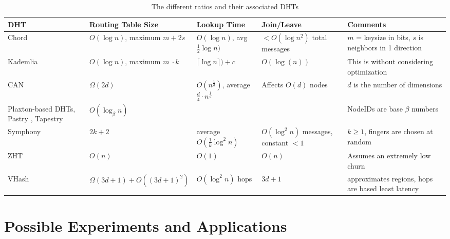 \documentclass[10pt,letterpaper,twoside]{report}
\begin{document}
\begin{table}[h]
	\small
	\centering
	\begin{tabularx}{\textwidth}{ |X|X|X|X|X| }
		\hline
		DHT & Routing Table Size & Lookup Time & Join/Leave & Comments \\ \hline  
		
		Chord \cite{chord} & $O(\log n)$, maximum $m +2s$ & $O(\log n)$, avg $\frac{1}{2} \log n)$  &  $<O(\log n^{2})$ total messages& $m$  = keysize in bits, $s$ is neighbors in 1 direction  \\ \hline
		
		Kademlia \cite{kademlia} & $O(\log n)$, maximum $m\ \cdot k$ & $\lceil \log n\rceil) + c$ & $O(\log(n))$& This is without considering optimization   \\ \hline
		CAN \cite{can} & $\Omega(2d)$ & $O(n^{\frac{1}{d}})$, average $\frac{d}{4}\cdot n^{\frac{1}{d}}$ & Affects $O(d)$ nodes & $d$ is the number of dimensions \\ \hline
		
		Plaxton-based DHTs, Pastry \cite{pastry}, Tapestry \cite{tapestry} & $O(\log_{\beta} n)$ & & &  NodeIDs are base $\beta$ numbers \\ \hline
		
        Symphony \cite{symphony}& $2k + 2$&   average $O(\frac{1}{k} \log^{2} n )$ & $O(\log^{2} n)$ messages,  constant $<1$ &  $k \geq 1$, fingers are chosen at random\\ \hline  
		
        ZHT \cite{li2013zht}&   $O(n)$& $O(1)$ &  $O(n)$ & Assumes an extremely low churn \\ \hline
        
        VHash & $\Omega(3d+1) + O((3d+1)^{2})$ & $O(\log^{2}n)$ hops & $3d + 1$ & approximates regions, hops are based least latency\\ \hline
	\end{tabularx}
	\caption{The different ratios and their associated DHTs}
	\label{tab:tradeoffs}
\end{table}






\chapter{Possible Experiments and Applications}
\end{document}
